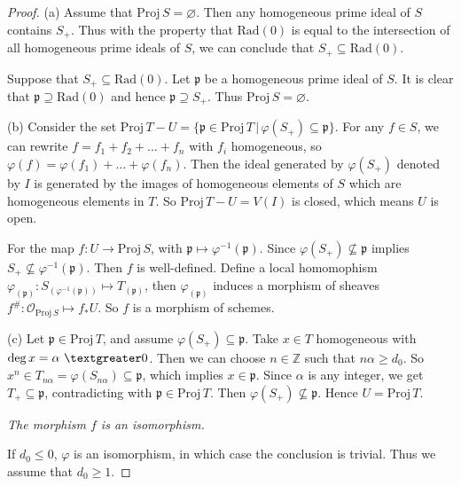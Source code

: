 \documentclass[12pt]{amsart}
\begin{document}
\begin{proof}
   (a) Assume that $\mathrm{Proj}\, S = \varnothing$. Then any homogeneous prime ideal of $S$ contains $S_+$. Thus with the property that $\mathrm{Rad}(0)$ is equal to the intersection of all homogeneous prime ideals of $S$, we can conclude that $S_+\subseteq\mathrm{Rad}(0)$.
   
   Suppose that $S_{+}\subseteq\mathrm{Rad}(0)$. Let $\mathfrak{p}$ be a homogeneous prime ideal of $S$. It is clear that $\mathfrak{p}\supseteq\mathrm{Rad}(0)$ and hence $\mathfrak{p}\supseteq S_{+}$. Thus $\mathrm{Proj}\, S = \varnothing$.
   
   (b) Consider the set $\mathrm{Proj}\, T-U = \{\mathfrak{p}\in\mathrm{Proj}\, T\,|\, \varphi(S_{+})\subseteq \mathfrak{p}\}$. For any $f \in S$, we can rewrite $f = f_{1}+f_{2}+\dots+f_{n}$ with $f_{i}$ homogeneous, so $\varphi(f)=\varphi(f_{1})+\dots+\varphi(f_{n})$. Then the ideal generated by $\varphi(S_{+})$ denoted by $I$ is generated by the images of homogeneous elements of $S$ which are homogeneous elements in $T$. So $\mathrm{Proj}\, T-U=V(I)$ is closed, which means $U$ is open.
   
   For the map $f : U \to \mathrm{Proj}\, S$, with $\mathfrak{p} \mapsto \varphi^{-1}(\mathfrak{p})$. Since $\varphi(S_{+}) \not\subseteq \mathfrak{p}$ implies $S_{+} \not\subseteq \varphi^{-1}(\mathfrak{p})$. Then $f$ is well-defined. Define a local homomophism $\varphi_{(\mathfrak{p})}: S_{(\varphi^{-1}(\mathfrak{p}))} \mapsto T_{(\mathfrak{p})}$, then $\varphi_{(\mathfrak{p})}$ induces a morphism of sheaves $f^{\#} : \mathcal{O}_{\mathrm{Proj}\, S} \mapsto f_{*}U$. So $f$ is a morphism of schemes.
   
   (c) Let $\mathfrak{p} \in \mathrm{Proj}\, T$, and assume $\varphi(S_{+}) \subseteq \mathfrak{p}$. Take $x \in T$ homogeneous with $\deg x = \alpha\ \textgreater 0$. Then we can choose $n\in\mathbb{Z}$ such that $n\alpha \geq d_{0}$. So $x^{n} \in T_{n\alpha} = \varphi(S_{n\alpha}) \subseteq \mathfrak{p}$, which implies $x \in \mathfrak{p}$. Since $\alpha$ is any integer, we get $T_{+} \subseteq \mathfrak{p}$, contradicting with $\mathfrak{p} \in \mathrm{Proj}\, T$. Then $\varphi(S_{+}) \not\subseteq \mathfrak{p}$. Hence $U = \mathrm{Proj}\, T$.
   
   \emph{The morphism $f$ is an isomorphism.}
   
   If $d_0\leq0$, $\varphi$ is an isomorphism, in which case the conclusion is trivial. Thus we assume that $d_0\geq1$.
   

\end{proof}
\end{document}
